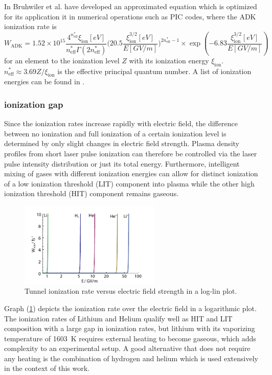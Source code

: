 In \cite{bruhwiler2003PoP} Bruhwiler et al. have developed an approximated equation which is optimized for its application it in numerical operations such as PIC codes, where the ADK ionization rate is 
\begin{equation}
W_\mathrm{ADK}=1.52\times 10^{15}\frac{4^{n^*_\mathrm{eff}}\xi_\mathrm{ion}[eV]}{n^*_\mathrm{eff}\Gamma(2n^*_\mathrm{eff})}\Big(20.5\frac{\xi_\mathrm{ion}^{3/2}[eV]}{E[GV/m]}\Big)^{2n^*_\mathrm{eff}-1}\times \exp(-6.83\frac{\xi_\mathrm{ion}^{3/2}[eV]}{E[GV/m]})
\label{eqn:ADK_Bruhwiler}
\end{equation}
for an element to the ionization level $Z$ with its ionization energy $\xi_\mathrm{ion}$.
$n^*_\mathrm{eff}\approx 3.69Z/\xi_\mathrm{ion}$ is the effective principal quantum number.
A list of ionization energies can be found in \cite{Kelly_1982_Ion_Energies}.
\subsubsection*{ionization gap}
Since the ionization rates increase rapidly with electric field, the difference between no ionization and full ionization of a certain ionization level is determined by only slight changes in electric field strength. Plasma density profiles from short laser pulse ionization can therefore be controlled via the laser pulse intensity distribution or just its total energy. 
Furthermore, intelligent mixing of gases with different ionization energies can allow for distinct ionization of a low ionization threshold (LIT) component into plasma while the other high ionization threshold (HIT) component remains gaseous.

\begin{figure}[ht]
\centering
\includegraphics[width=0.6\textwidth]{theory/images/edited/Ionization_gap.pdf}
\caption{Tunnel ionization rate versus electric field strength in a log-lin plot. }
\label{img:Ionization_gap}
\end{figure}
Graph (\ref{img:Ionization_gap}) depicts the ionization rate over the electric field in a logarithmic plot. The ionization rates of Lithium and Helium qualify well as HIT and LIT composition with a large gap in ionization rates, but lithium with its vaporizing temperature of 1603\ K \cite{zhang2011boilingTemp} requires external heating to become gaseous, which adds complexity to an experimental setup. A good alternative that does not require any heating is the combination of hydrogen and helium which is used extensively in the context of this work.


